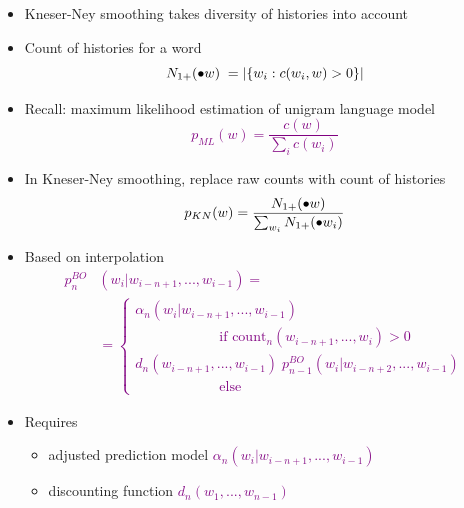 \documentclass[landscape]{slides}
\newcommand{\maths}[1]{\textcolor{purple}{#1}}
\begin{document}
\begin{itemize}
\item Kneser-Ney smoothing takes diversity of histories into account
\item Count of histories for a word
\maths{\begin{equation*}
N_{1+}(\bullet w) \;= |\{ w_i:c(w_i,w)>0 \}|\\
\end{equation*}}
\vspace{-13mm}
\item Recall: maximum likelihood estimation of unigram language model
\maths{\begin{equation*}
p_{ML}(w) = \frac{c(w)}{\sum_i c(w_i)}
\end{equation*}}
\vspace{-13mm}
\item In Kneser-Ney smoothing, replace raw counts with count of histories
\maths{\begin{equation*}
p_{KN}(w) = \frac{N_{1+}(\bullet w)}{\sum_{w_i} N_{1+}(\bullet w_i)}\vspace{-20mm}
\end{equation*}}
\end{itemize}



\begin{itemize}
\item Based on interpolation
\maths{\begin{equation*}
\begin{split}
p^{BO}_n&(w_i|w_{i-n+1},...,w_{i-1}) =\\
& = 
\begin{cases}
\alpha_n(w_i|w_{i-n+1},...,w_{i-1}) \\
\phantom{--- ---} \text{if count$_n(w_{i-n+1},...,w_i)>0$} \\[2mm]
d_n(w_{i-n+1},...,w_{i-1}) \; p^{BO}_{n-1}(w_i|w_{i-n+2},...,w_{i-1}) \\
\phantom{--- ---}\text{else}
\end{cases}
\end{split}
\end{equation*}}
\vspace{-15mm}
\item Requires 
\begin{itemize}
\item adjusted prediction model \maths{$\alpha_n(w_i|w_{i-n+1},...,w_{i-1})$}
\item discounting function \maths{$d_n(w_1,...,w_{n-1})$}
\end{itemize}
\end{itemize}
\end{document}
